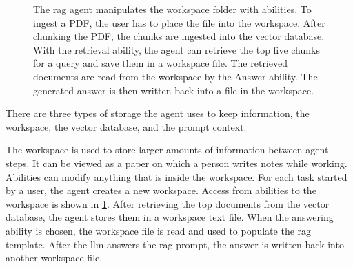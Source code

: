 \documentclass[../main.tex]{subfiles}
\begin{document}
\begin{figure}[t]
    \centering
    \caption{The \gls{rag} agent manipulates the \textcolor{emph red}{workspace}
        folder with \textcolor{emph blue}{abilities}.
        To ingest a PDF, the user has to place the file into the workspace.
        After chunking the PDF, the chunks are ingested into the vector database.
        With the retrieval ability,
        the agent can retrieve the top five chunks for a query
        and save them in a workspace file.
        The retrieved documents are read from the workspace by the Answer ability.
        The generated answer is then written back into a file in the workspace.}
    \label{fig:abilities_workspace}
\end{figure}


There are three types of storage the agent uses to keep information,
the workspace, the vector database, and the prompt context.

The workspace is used to store larger amounts of information between agent steps.
It can be viewed as a paper on which a person writes notes while working.
Abilities can modify anything that is inside the workspace.
For each task started by a user, the agent creates a new workspace.
Access from abilities to the workspace is shown in \ref{fig:abilities_workspace}.
After retrieving the top documents from the vector database, the agent stores
them in a workspace text file.
When the answering ability is chosen, the workspace file is read and used to populate
the \gls{rag} template.
After the \gls{llm} answers the \gls{rag} prompt, the answer is written back
into another workspace file.
\end{document}
